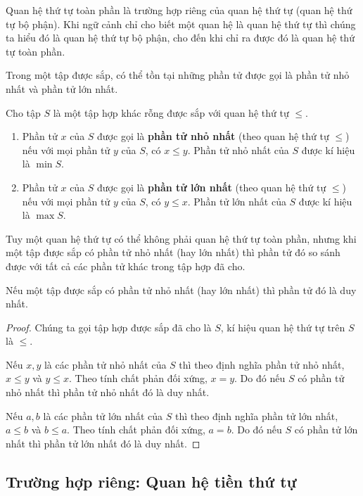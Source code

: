 Quan hệ thứ tự toàn phần là trường hợp riêng của quan hệ thứ tự (quan hệ thứ tự bộ phận). Khi ngữ cảnh chỉ cho biết một quan hệ là quan hệ thứ tự thì chúng ta hiểu đó là quan hệ thứ tự bộ phận, cho đến khi chỉ ra được đó là quan hệ thứ tự toàn phần.

Trong một tập được sắp, có thể tồn tại những phần tử được gọi là phần tử nhỏ nhất và phần tử lớn nhất.
\begin{definition}
    Cho tập $S$ là một tập hợp khác rỗng được sắp với quan hệ thứ tự $\leq$.
    \begin{enumerate}[label={(\roman*)}]
        \item Phần tử $x$ của $S$ được gọi là \textbf{phần tử nhỏ nhất} (theo quan hệ thứ tự $\leq$) nếu với mọi phần tử $y$ của $S$, có $x\leq y$. Phần tử nhỏ nhất của $S$ được kí hiệu là $\min S$.
        \item Phần tử $x$ của $S$ được gọi là \textbf{phần tử lớn nhất} (theo quan hệ thứ tự $\leq$) nếu với mọi phần tử $y$ của $S$, có $y\leq x$. Phần tử lớn nhất của $S$ được kí hiệu là $\max S$.
    \end{enumerate}
\end{definition}

Tuy một quan hệ thứ tự có thể không phải quan hệ thứ tự toàn phần, nhưng khi một tập được sắp có phần tử nhỏ nhất (hay lớn nhất) thì phần tử đó so sánh được với tất cả các phần tử khác trong tập hợp đã cho.

\begin{theorem}
    Nếu một tập được sắp có phần tử nhỏ nhất (hay lớn nhất) thì phần tử đó là duy nhất.
\end{theorem}

\begin{proof}
    Chúng ta gọi tập hợp được sắp đã cho là $S$, kí hiệu quan hệ thứ tự trên $S$ là $\leq$.

    Nếu $x, y$ là các phần tử nhỏ nhất của $S$ thì theo định nghĩa phần tử nhỏ nhất, $x\leq y$ và $y\leq x$. Theo tính chất phản đối xứng, $x = y$. Do đó nếu $S$ có phần tử nhỏ nhất thì phần tử nhỏ nhất đó là duy nhất.

    Nếu $a, b$ là các phần tử lớn nhất của $S$ thì theo định nghĩa phần tử lớn nhất, $a\leq b$ và $b\leq a$. Theo tính chất phản đối xứng, $a = b$. Do đó nếu $S$ có phần tử lớn nhất thì phần tử lớn nhất đó là duy nhất.
\end{proof}

\subsection{Trường hợp riêng: Quan hệ tiền thứ tự}

